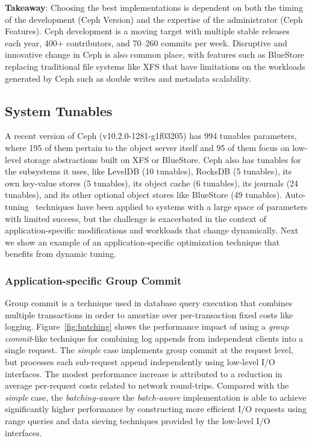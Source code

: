 \textbf{Takeaway}: Choosing the best implementations is dependent on both the
timing of the development (Ceph Version) and the expertise of the
administrator (Ceph Features). Ceph development is a moving target with
multiple stable releases each year, 400+ contributors, and 70--260 commits per
week.  Disruptive and innovative change in Ceph is also common place, with
features such as BlueStore~\cite{weil:vault2016-bluestore} replacing
traditional file systems like XFS that have limitations on the workloads
generated by Ceph such as double writes and metadata scalability. 

\subsection{System Tunables}

A recent version of Ceph (v10.2.0-1281-g1f03205) has 994 tunables
parameters, where 195 of them pertain to the object server itself
and 95 of them focus on low-level storage abstractions built on XFS or
BlueStore. Ceph also has tunables for the subsystems it uses, like
LevelDB (10 tunables), RocksDB (5 tunables), its own key-value stores (5
tunables), its object cache (6 tunables), its journals (24 tunables), and its
other optional object stores like BlueStore (49 tunables).
Auto-tuning~\cite{behzad:sc2013-autotuning} techniques have been applied to
systems with a large space of parameters with limited success, but the
challenge is exacerbated in the context of application-specific modifications
and workloads that change dynamically. Next we show an example of an
application-specific optimization technique that benefits from dynamic tuning.

\subsubsection{Application-specific Group Commit}

Group commit is a technique used in database query execution that combines
multiple transactions in order to amortize over per-transaction fixed costs
like logging. Figure~\ref{fig:batching} shows the performance impact of using
a \emph{group commit}-like technique for combining log appends from
independent clients into a single request.  The \emph{simple} case implements
group commit at the request level, but processes each sub-request append
independently using low-level I/O interfaces. The modest performance increase is
attributed to a reduction in average per-request costs related to network
round-trips. Compared with the \emph{simple} case, the \emph{batching-aware}
the \emph{batch-aware} implementation is able to achieve significantly higher
performance by constructing more efficient I/O requests using range queries
and data sieving techniques provided by the low-level I/O interfaces.



